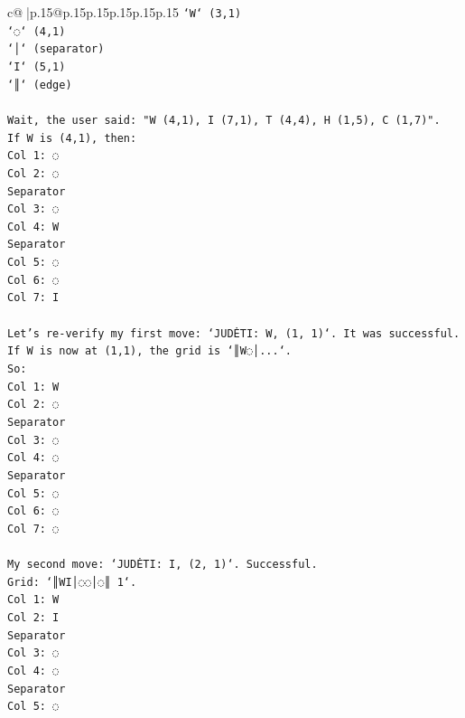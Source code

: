 \documentclass{article}
\begin{document}
{\begin{supertabular}{c@{$\;$}|p{.15\linewidth}@{}p{.15\linewidth}p{.15\linewidth}p{.15\linewidth}p{.15\linewidth}p{.15\linewidth}}
{{{\texttt{`W` (3,1)} \\
\texttt{`◌` (4,1)} \\
\texttt{`│` (separator)} \\
\texttt{`I` (5,1)} \\
\texttt{`║` (edge)} \\
\\ 
\texttt{Wait, the user said: "W (4,1), I (7,1), T (4,4), H (1,5), C (1,7)".} \\
\texttt{If W is (4,1), then:} \\
\texttt{Col 1: ◌} \\
\texttt{Col 2: ◌} \\
\texttt{Separator} \\
\texttt{Col 3: ◌} \\
\texttt{Col 4: W} \\
\texttt{Separator} \\
\texttt{Col 5: ◌} \\
\texttt{Col 6: ◌} \\
\texttt{Col 7: I} \\
\\ 
\texttt{Let's re{-}verify my first move: `JUDĖTI: W, (1, 1)`. It was successful.} \\
\texttt{If W is now at (1,1), the grid is `║W◌│...`.} \\
\texttt{So:} \\
\texttt{Col 1: W} \\
\texttt{Col 2: ◌} \\
\texttt{Separator} \\
\texttt{Col 3: ◌} \\
\texttt{Col 4: ◌} \\
\texttt{Separator} \\
\texttt{Col 5: ◌} \\
\texttt{Col 6: ◌} \\
\texttt{Col 7: ◌} \\
\\ 
\texttt{My second move: `JUDĖTI: I, (2, 1)`. Successful.} \\
\texttt{Grid: `║WI│◌◌│◌║ 1`.} \\
\texttt{Col 1: W} \\
\texttt{Col 2: I} \\
\texttt{Separator} \\
\texttt{Col 3: ◌} \\
\texttt{Col 4: ◌} \\
\texttt{Separator} \\
\texttt{Col 5: ◌} \\
}}}
\end{supertabular}}
\end{document}
